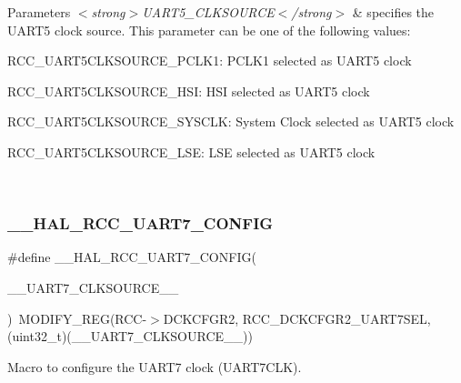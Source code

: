 \begin{DoxyParams}{Parameters}
{\em $<$strong$>$\+U\+A\+R\+T5\+\_\+\+C\+L\+K\+S\+O\+U\+R\+C\+E$<$/strong$>$} & specifies the U\+A\+R\+T5 clock source. This parameter can be one of the following values\+: \begin{DoxyItemize}
\item R\+C\+C\+\_\+\+U\+A\+R\+T5\+C\+L\+K\+S\+O\+U\+R\+C\+E\+\_\+\+P\+C\+L\+K1\+: P\+C\+L\+K1 selected as U\+A\+R\+T5 clock \item R\+C\+C\+\_\+\+U\+A\+R\+T5\+C\+L\+K\+S\+O\+U\+R\+C\+E\+\_\+\+H\+SI\+: H\+SI selected as U\+A\+R\+T5 clock \item R\+C\+C\+\_\+\+U\+A\+R\+T5\+C\+L\+K\+S\+O\+U\+R\+C\+E\+\_\+\+S\+Y\+S\+C\+LK\+: System Clock selected as U\+A\+R\+T5 clock \item R\+C\+C\+\_\+\+U\+A\+R\+T5\+C\+L\+K\+S\+O\+U\+R\+C\+E\+\_\+\+L\+SE\+: L\+SE selected as U\+A\+R\+T5 clock \end{DoxyItemize}
\\
\hline
\end{DoxyParams}
\mbox{\label{group___r_c_c_ex___exported___macros_gaccf73dcde838afb32d15e578e2097607}} 
\subsubsection{\texorpdfstring{\_\_HAL\_RCC\_UART7\_CONFIG}{\_\_HAL\_RCC\_UART7\_CONFIG}}
{\footnotesize\ttfamily \#define \+\_\+\+\_\+\+H\+A\+L\+\_\+\+R\+C\+C\+\_\+\+U\+A\+R\+T7\+\_\+\+C\+O\+N\+F\+IG(\begin{DoxyParamCaption}\item[{}]{\+\_\+\+\_\+\+U\+A\+R\+T7\+\_\+\+C\+L\+K\+S\+O\+U\+R\+C\+E\+\_\+\+\_\+ }\end{DoxyParamCaption})~M\+O\+D\+I\+F\+Y\+\_\+\+R\+EG(R\+CC-\/$>$D\+C\+K\+C\+F\+G\+R2, R\+C\+C\+\_\+\+D\+C\+K\+C\+F\+G\+R2\+\_\+\+U\+A\+R\+T7\+S\+EL, (uint32\+\_\+t)(\+\_\+\+\_\+\+U\+A\+R\+T7\+\_\+\+C\+L\+K\+S\+O\+U\+R\+C\+E\+\_\+\+\_\+))}



Macro to configure the U\+A\+R\+T7 clock (U\+A\+R\+T7\+C\+LK). 


